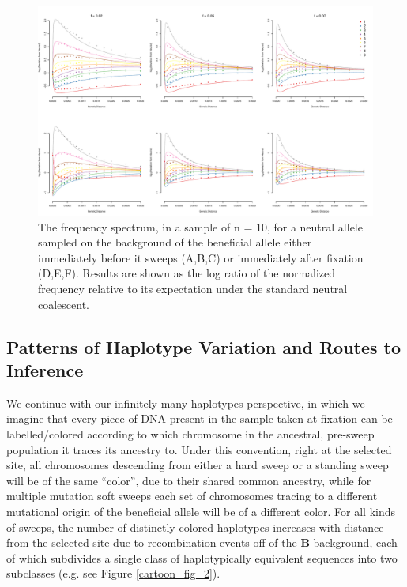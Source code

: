 \documentclass[a4paper,10pt]{article}
\begin{document}
\begin{figure}
	\includegraphics[width = \textwidth]{../Paper_Figures/freq_spec_nosweep_logfold_sixpanel_020507.pdf}
	\caption{The frequency spectrum, in a sample of n = 10, for a neutral allele sampled on the background of the beneficial allele either immediately before it sweeps (A,B,C) or immediately after fixation (D,E,F). Results are shown as the log ratio of the normalized frequency relative to its expectation under the standard neutral coalescent.} \label{freq_spec}
\end{figure}

\subsection*{Patterns of Haplotype Variation and Routes to Inference}

We continue with our infinitely-many haplotypes perspective, in which we imagine that every piece of DNA present in the sample taken at fixation can be labelled/colored according to which chromosome in the ancestral, pre-sweep population it traces its ancestry to. Under this convention, right at the selected site, all chromosomes descending from either a hard sweep or a standing sweep will be of the same ``color'', due to their shared common ancestry, while for multiple mutation soft sweeps each set of chromosomes tracing to a different mutational origin of the beneficial allele will be of a different color. For all kinds of sweeps, the number of distinctly colored haplotypes increases with distance from the selected site due to recombination events off of the \textbf{B} background, each of which subdivides a single class of haplotypically equivalent sequences into two subclasses (e.g. see Figure \ref{cartoon_fig_2}).
\end{document}

